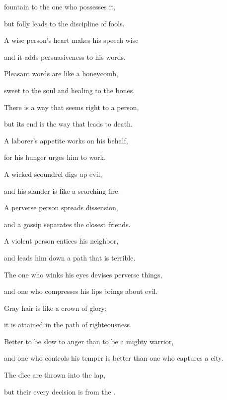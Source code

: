 {fountain
to the one who possesses
it,
\par }{\Q but folly
leads to the discipline
of fools.
\par }{\Q {}A wise
person’s heart
makes his speech
wise
\par }{\Q and it adds
persuasiveness
to
his words.
\par }{\Q {}Pleasant
words
are like a honeycomb,
\par }{\Q sweet
to the soul
and healing
to the bones.
\par }{\Q {}There
is a way
that seems right
to a person,
\par }{\Q but its end
is the way
that leads to death.
\par }{\Q {}A laborer’s
appetite
works
on his behalf,

\par }{\Q for
his hunger
urges him to work.
\par }{\Q {}A wicked
scoundrel
digs up
evil,
\par }{\Q and his slander
is like a scorching
fire.
\par }{\Q {}A perverse
person spreads
dissension,
\par }{\Q and a gossip
separates
the closest
friends.
\par }{\Q {}A violent
person
entices
his neighbor,
\par }{\Q and leads
him down a path
that is terrible.
\par }{\Q {}The one who winks
his eyes
devises
perverse things,
\par }{\Q and one who compresses
his lips
brings about
evil.
\par }{\Q {}Gray hair
is like a crown
of glory;
\par }{\Q it is attained
in the path
of righteousness.
\par }{\Q {}Better
to be slow
to anger
than to be a mighty warrior,
\par }{\Q and one who controls
his temper
is better than one who captures
a city.
\par }{\Q {}The dice
are thrown into the lap,

\par }{\Q but their every
decision
is from the
{}.

}
